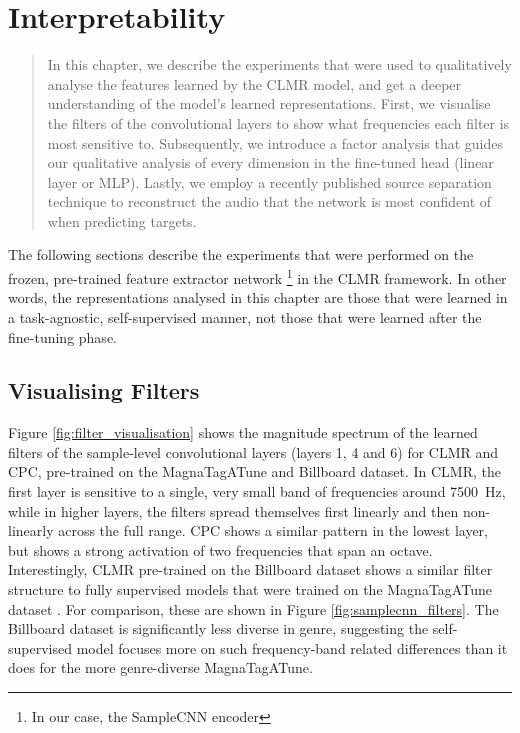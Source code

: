 \chapter{Interpretability}

\begin{quote}
    In this chapter, we describe the experiments that were used to qualitatively analyse the features learned by the CLMR model, and get a deeper understanding of the model's learned representations. First, we visualise the filters of the convolutional layers to show what frequencies each filter is most sensitive to. Subsequently, we introduce a factor analysis that guides our qualitative analysis of every dimension in the fine-tuned head (linear layer or MLP). Lastly, we employ a recently published source separation technique to reconstruct the audio that the network is most confident of when predicting targets.
\end{quote}

The following sections describe the experiments that were performed on the frozen, pre-trained feature extractor network \footnote{In our case, the SampleCNN encoder} in the CLMR framework. In other words, the representations analysed in this chapter are those that were learned in a task-agnostic, self-supervised manner, not those that were learned after the fine-tuning phase.

\section{Visualising Filters}
Figure \ref{fig:filter_visualisation} shows the magnitude spectrum of the learned filters of the sample-level convolutional layers (layers 1, 4 and 6) for CLMR and CPC, pre-trained on the MagnaTagATune and Billboard dataset.
In CLMR, the first layer is sensitive to a single, very small band of frequencies around 7500~Hz, while in higher layers, the filters spread themselves first linearly and then non-linearly across the full range.
CPC shows a similar pattern in the lowest layer, but shows a strong activation of two frequencies that span an octave.
Interestingly, CLMR pre-trained on the Billboard dataset shows a similar filter structure to fully supervised models that were trained on the MagnaTagATune dataset \cite{dieleman2014end,lee2018samplecnn}. For comparison, these are shown in Figure \ref{fig:samplecnn_filters}.
The Billboard dataset is significantly less diverse in genre, suggesting the self-supervised model focuses more on such frequency-band related differences than it does for the more genre-diverse MagnaTagATune.


